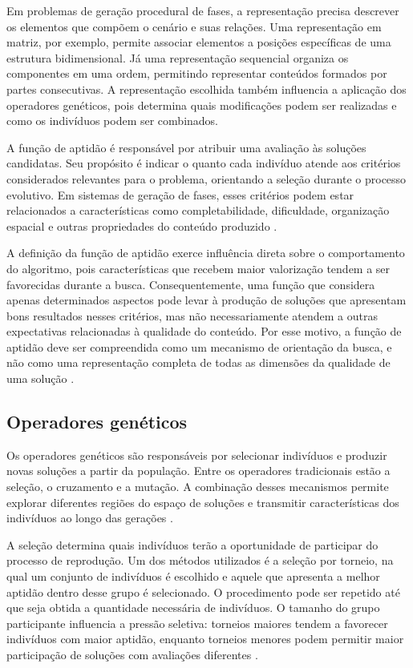 Em problemas de geração procedural de fases, a
representação precisa descrever os elementos que
compõem o cenário e suas relações. Uma representação
em matriz, por exemplo, permite associar elementos
a posições específicas de uma estrutura bidimensional.
Já uma representação sequencial organiza os componentes
em uma ordem, permitindo representar conteúdos formados
por partes consecutivas. A representação escolhida
também influencia a aplicação dos operadores genéticos,
pois determina quais modificações podem ser realizadas
e como os indivíduos podem ser combinados.

A função de aptidão é responsável por atribuir uma
avaliação às soluções candidatas. Seu propósito é
indicar o quanto cada indivíduo atende aos critérios
considerados relevantes para o problema, orientando
a seleção durante o processo evolutivo. Em sistemas
de geração de fases, esses critérios podem estar
relacionados a características como completabilidade,
dificuldade, organização espacial e outras propriedades
do conteúdo produzido \cite{Goldberg1989,Togelius2011}.

A definição da função de aptidão exerce influência
direta sobre o comportamento do algoritmo, pois
características que recebem maior valorização tendem
a ser favorecidas durante a busca. Consequentemente,
uma função que considera apenas determinados aspectos
pode levar à produção de soluções que apresentam
bons resultados nesses critérios, mas não necessariamente
atendem a outras expectativas relacionadas à qualidade
do conteúdo. Por esse motivo, a função de aptidão
deve ser compreendida como um mecanismo de orientação
da busca, e não como uma representação completa
de todas as dimensões da qualidade de uma solução
\cite{Mitchell1996,EibenSmith2003}.

\subsection{Operadores genéticos}

Os operadores genéticos são responsáveis por
selecionar indivíduos e produzir novas soluções
a partir da população. Entre os operadores
tradicionais estão a seleção, o cruzamento e
a mutação. A combinação desses mecanismos permite explorar
diferentes regiões do espaço de soluções e transmitir
características dos indivíduos ao longo das gerações
\cite{Goldberg1989,Mitchell1996,EibenSmith2003}.

A seleção determina quais indivíduos terão a
oportunidade de participar do processo de reprodução.
Um dos métodos utilizados é a seleção por torneio,
na qual um conjunto de indivíduos é escolhido
e aquele que apresenta a melhor aptidão dentro
desse grupo é selecionado. O procedimento pode
ser repetido até que seja obtida a quantidade
necessária de indivíduos. O tamanho do grupo
participante influencia a pressão seletiva:
torneios maiores tendem a favorecer indivíduos
com maior aptidão, enquanto torneios menores
podem permitir maior participação de soluções
com avaliações diferentes \cite{EibenSmith2003}.

